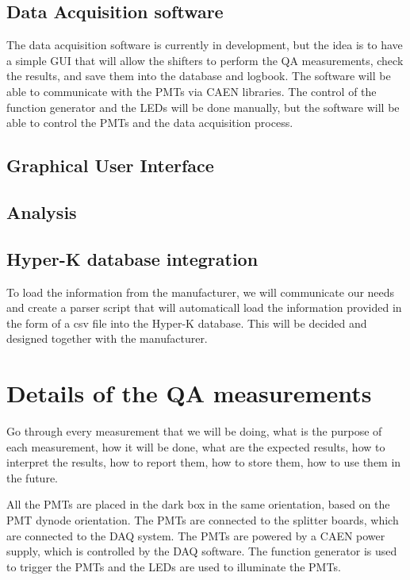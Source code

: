 \documentclass[12pt,a4paper]{article}
\begin{document}
\subsection{Data Acquisition software}
The data acquisition software is currently in development, but the idea is to have a simple GUI that will allow the shifters to perform the QA measurements, check the results, and save them into the database and logbook. The software will be able to communicate with the PMTs via CAEN libraries. The control of the function generator and the LEDs will be done manually, but the software will be able to control the PMTs and the data acquisition process.

\subsection{Graphical User Interface}

\subsection{Analysis}

\subsection{Hyper-K database integration}
To load the information from the manufacturer, we will communicate our needs and create a parser script that will automaticall load the information provided in the form of a csv file into the Hyper-K database. This will be decided and designed together with the manufacturer.

\section{Details of the QA measurements}\label{sec:QAMeasurements}

Go through every measurement that we will be doing, what is the purpose of each measurement, how it will be done, what are the expected results, how to interpret the results, how to report them, how to store them, how to use them in the future.

All the PMTs are placed in the dark box in the same orientation, based on the PMT dynode orientation. The PMTs are connected to the splitter boards, which are connected to the DAQ system. The PMTs are powered by a CAEN power supply, which is controlled by the DAQ software. The function generator is used to trigger the PMTs and the LEDs are used to illuminate the PMTs.
\end{document}
